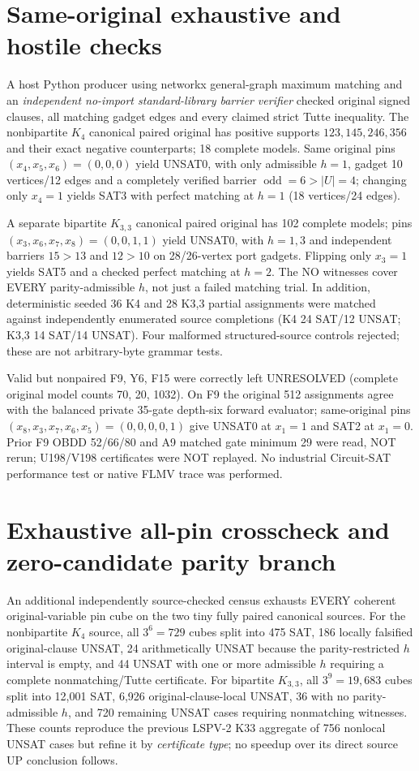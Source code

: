 \documentclass[11pt]{article}
\begin{document}
\section{Same-original exhaustive and hostile checks}
A host Python producer using networkx general-graph maximum matching and an \emph{independent no-import standard-library barrier verifier} checked original signed clauses, all matching gadget edges and every claimed strict Tutte inequality. The nonbipartite $K_4$ canonical paired original has positive supports $123,145,246,356$ and their exact negative counterparts; 18 complete models. Same original pins $(x_4,x_5,x_6)=(0,0,0)$ yield UNSAT0, with only admissible $h=1$, gadget 10 vertices/12 edges and a completely verified barrier $\operatorname{odd}=6>|U|=4$; changing only $x_4=1$ yields SAT3 with perfect matching at $h=1$ (18 vertices/24 edges).

A separate bipartite $K_{3,3}$ canonical paired original has 102 complete models; pins $(x_3,x_6,x_7,x_8)=(0,0,1,1)$ yield UNSAT0, with $h=1,3$ and independent barriers $15>13$ and $12>10$ on 28/26-vertex port gadgets. Flipping only $x_3=1$ yields SAT5 and a checked perfect matching at $h=2$. The NO witnesses cover EVERY parity-admissible $h$, not just a failed matching trial. In addition, deterministic seeded 36 K4 and 28 K3,3 partial assignments were matched against independently enumerated source completions (K4 24 SAT/12 UNSAT; K3,3 14 SAT/14 UNSAT). Four malformed structured-source controls rejected; these are not arbitrary-byte grammar tests.

Valid but nonpaired F9, Y6, F15 were correctly left UNRESOLVED (complete original model counts 70, 20, 1032). On F9 the original 512 assignments agree with the balanced private 35-gate depth-six forward evaluator; same-original pins $(x_8,x_3,x_7,x_6,x_5)=(0,0,0,0,1)$ give UNSAT0 at $x_1=1$ and SAT2 at $x_1=0$. Prior F9 OBDD 52/66/80 and A9 matched gate minimum 29 were read, NOT rerun; U198/V198 certificates were NOT replayed. No industrial Circuit-SAT performance test or native FLMV trace was performed.


\section{Exhaustive all-pin crosscheck and zero-candidate parity branch}
An additional independently source-checked census exhausts EVERY coherent original-variable pin cube on the two tiny fully paired canonical sources. For the nonbipartite $K_4$ source, all $3^6=729$ cubes split into 475 SAT, 186 locally falsified original-clause UNSAT, 24 arithmetically UNSAT because the parity-restricted $h$ interval is empty, and 44 UNSAT with one or more admissible $h$ requiring a complete nonmatching/Tutte certificate. For bipartite $K_{3,3}$, all $3^9=19{,}683$ cubes split into 12,001 SAT, 6,926 original-clause-local UNSAT, 36 with no parity-admissible $h$, and 720 remaining UNSAT cases requiring nonmatching witnesses. These counts reproduce the previous LSPV-2 K33 aggregate of 756 nonlocal UNSAT cases but refine it by \emph{certificate type}; no speedup over its direct source UP conclusion follows.
\end{document}
